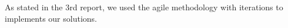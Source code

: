 As stated in the 3rd report, we used the agile methodology with iterations to implements our solutions. 